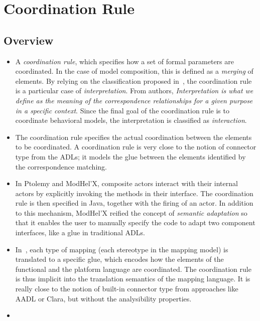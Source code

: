 \section{Coordination Rule}
\subsection{Overview}
\begin{itemize}
\item A \emph{coordination rule}, which specifies how a set of formal parameters are coordinated. In the case of model composition, this is defined as a \emph{merging} of elements. By relying on the classification proposed in~\cite{clavreulmodelcompo}, the coordination rule is a particular case of \emph{interpretation}. From authors, \emph{Interpretation is what we define as the meaning of the correspondence relationships for a given purpose in a specific context}. Since the final goal of the coordination rule is to coordinate behavioral models, the interpretation is classified as \emph{interaction}.
			\item The coordination rule specifies the actual coordination between the elements to be coordinated. A coordination rule is very close to the notion of connector type from the ADLs; it models the glue between the elements identified by the correspondence matching.
			
			\item In Ptolemy and ModHel'X, composite actors interact with their internal actors by explicitly invoking the methods in their interface. The coordination rule is then specified in Java, together with the firing of an actor. In addition to this mechanism, ModHel'X reified the concept of \emph{semantic adaptation} so that it enables the user to manually specify the code to adapt two component interfaces, like a glue in traditional ADLs.
			
			\item In~\cite{dinatale}, each type of mapping (\ie each stereotype in the mapping model) is translated to a specific glue, which encodes how the elements of the functional and the platform language are coordinated. The coordination rule is thus implicit into the translation semantics of the mapping language. It is really close to the notion of built-in connector type from approaches like AADL or Clara, but without the analysibility properties.        
			
			\item {}  
		\end{itemize}
		
